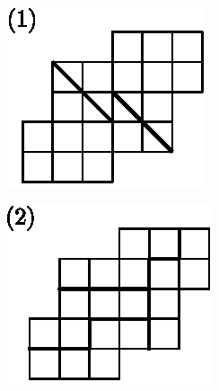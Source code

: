 \begin{enumerate}
\begin{minipage}[c]{4.5cm}
\begin{figure}[H]
\centering
\includegraphics{images/chap11/ans14-1.eps}
\end{figure}
\end{minipage}
\begin{minipage}[c]{4.5cm}
\begin{figure}[H]
\centering
\includegraphics{images/chap11/ans14-2.eps}
\end{figure}
\end{minipage}


\end{enumerate}
